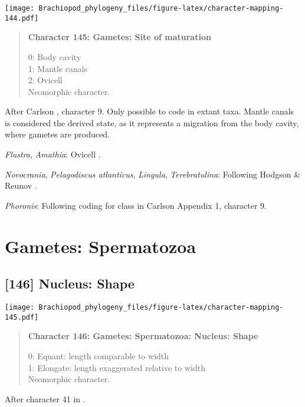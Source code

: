 \documentclass[openany]{book}
\theoremstyle{definition}
\theoremstyle{definition}
\theoremstyle{definition}
\theoremstyle{remark}
\begin{document}
\texttt{[image: Brachiopod\_phylogeny\_files/figure-latex/character-mapping-144.pdf]}

\begin{quote}
\textbf{Character 145: Gametes: Site of maturation}

0: Body cavity\\
1: Mantle canals\\
2: Ovicell\\
Neomorphic character.
\end{quote}

After Carlson \citeyearpar{Carlson1995Phylogeneticrelationships},
character 9. Only possible to code in extant taxa. Mantle canals is
considered the derived state, as it represents a migration from the body
cavity, where gametes are produced.

\hypertarget{Amathia-coding-145}{}
\emph{Flustra}, \emph{Amathia}: Ovicell \citep{Franzen1977}.

\hypertarget{Lingula-coding-145}{}
\emph{Novocrania}, \emph{Pelagodiscus atlanticus}, \emph{Lingula},
\emph{Terebratulina}: Following Hodgson \& Reunov
\citeyearpar{Hodgson1994Ultrastructureof}.

\hypertarget{Phoronis-coding-145}{}
\emph{Phoronis}: Following coding for class in Carlson
\citeyearpar{Carlson1995Phylogeneticrelationships} Appendix 1, character
9.

\section{Gametes: Spermatozoa}\label{gametes-spermatozoa}

\subsection*{{[}146{]} Nucleus: Shape}\label{nucleus-shape}

\texttt{[image: Brachiopod\_phylogeny\_files/figure-latex/character-mapping-145.pdf]}

\begin{quote}
\textbf{Character 146: Gametes: Spermatozoa: Nucleus: Shape}

0: Equant: length comparable to width\\
1: Elongate: length exaggerated relative to width\\
Neomorphic character.
\end{quote}

After character 41 in \citet{Ponder1997}.
\end{document}
